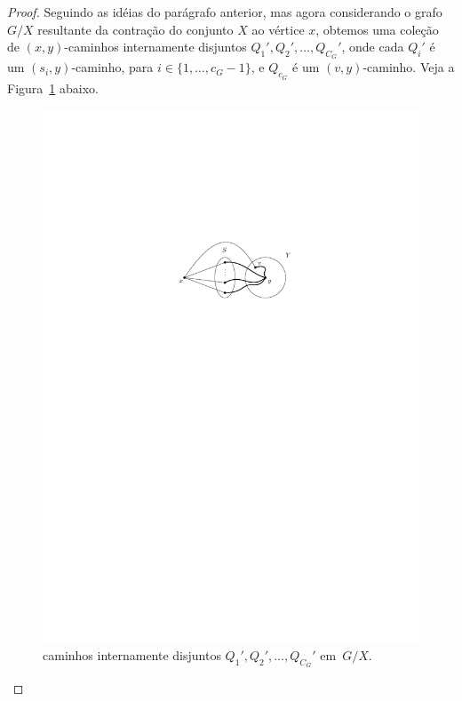 \documentclass[12pt, a4paper]{article}
\theoremstyle{definition}
\begin{document}
\begin{proof}
Seguindo as idéias do parágrafo anterior, mas agora considerando o grafo $G/X$ resultante da contração do conjunto $X$ ao vértice $x$, %
obtemos uma coleção de $(x,y)$-caminhos internamente disjuntos $Q_1', Q_2', \dots, Q_{C_G}'$, onde cada $Q_i'$ é um $(s_i,y)$-caminho, para $i \in \{1,\dots,c_G - 1\}$, e $Q_{c_G}$ é um $(v,y)$-caminho. Veja a Figura~\ref{fig:contract_x} abaixo.
\begin{figure}[H]
  \centering
  \includegraphics{g_contract_x.pdf}
  \caption{caminhos internamente disjuntos $Q_1', Q_2', \dots, Q_{C_G}'$ em~$G/X$.}
  \label{fig:contract_x}
\end{figure}



\end{proof}
\end{document}
